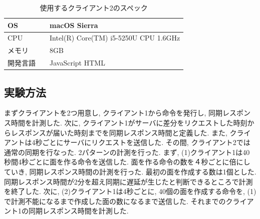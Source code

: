 \begin{table}[htbp]
\begin{center}
	\caption{使用するクライアント2のスペック}
	\begin{tabular}{|l|l|} \hline
		OS & macOS Sierra \\ \hline
		CPU & Intel(R) Core(TM) i5-5250U CPU 1.6GHz \\ \hline
		メモリ & 8GB \\ \hline
    開発言語　& JavaScript HTML \\ \hline
	\end{tabular}
	\label{client2}
\end{center}
\end{table}

\subsection{実験方法}
まずクライアントを2つ用意し, クライアント1から命令を発行し, 同期レスポンス時間を計測した.
次に, クライアント1がサーバに差分をリクエストした時刻からレスポンスが届いた時刻までを同期レスポンス時間と定義した.
また, クライアントは4秒ごとにサーバにリクエストを送信した. その間, クライアント2では通常の同期を行なった.
2パターンの計測を行った.
まず, (1)クライアント1は40秒間4秒ごとに面を作る命令を送信した. 面を作る命令の数を４秒ごとに倍にしていき, 同期レスポンス時間の計測を行った. 最初の面を作成する数は1個とした. 同期レスポンス時間が2分を超え同期に遅延が生じたと判断できるところで計測を終了した.
次に, (2)クライアント1は4秒ごとに, 40個の面を作成する命令を, (1)で計測不能になるまで作成した面の数になるまで送信した. それまでのクライアント1の同期レスポンス時間を計測した.

